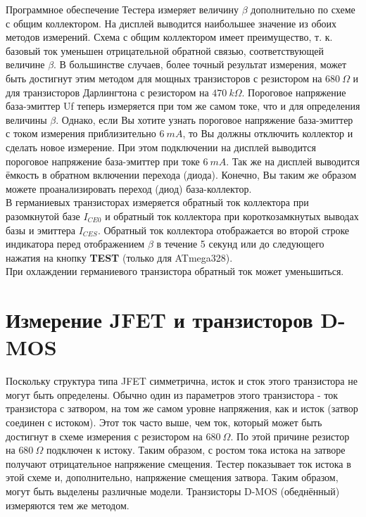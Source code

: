 Программное обеспечение Тестера измеряет величину \(\beta\) дополнительно по схеме с общим коллектором. На дисплей 
выводится наибольшее значение из обоих методов измерений. Схема с общим коллектором имеет преимущество, т. к. базовый 
ток уменьшен отрицательной обратной связью, соответствующей величине \(\beta\). В большинстве случаев, более точный 
результат измерения, может быть достигнут этим методом для мощных транзисторов с резистором на \(680~\Omega\) и для 
транзисторов Дарлингтона с резистором на \(470~k\Omega\).
Пороговое напряжение  база-эмиттер Uf  теперь измеряется при том же самом токе, что и для определения 
величины \(\beta\). Однако, если Вы хотите узнать пороговое напряжение база-эмиттер с током измерения приблизительно 
\(6~mA\), то Вы должны отключить коллектор и сделать новое измерение. При этом подключении на дисплей выводится 
пороговое напряжение база-эмиттер при токе \(6~mA\).  Так же на дисплей выводится ёмкость в обратном включении перехода 
(диода). Конечно, Вы таким же образом можете проанализировать переход (диод) база-коллектор.\\

В германиевых транзисторах измеряется обратный ток коллектора при разомкнутой базе \(I_{CE0}\) и
обратный ток коллектора при короткозамкнутых выводах базы и эмиттера \(I_{CES}\). Обратный ток коллектора 
отображается во второй строке индикатора перед отображением \(\beta\) в течение 5 секунд или до следующего нажатия 
на кнопку \textbf{ TEST} (только для ATmega328).\\

При охлаждении германиевого транзистора обратный ток может уменьшиться.

\section{Измерение JFET и транзисторов D-MOS}
Поскольку структура типа JFET симметрична, исток и сток этого транзистора не могут быть определены. Обычно один из 
параметров этого транзистора - ток транзистора с затвором, на том же самом уровне напряжения, как и исток (затвор 
соединен с истоком). Этот ток часто выше, чем ток, который может быть достигнут в схеме измерения с резистором 
на \(680~\Omega\). По этой причине резистор на \(680~\Omega\) подключен к истоку. Таким образом, с ростом тока  
истока на затворе получают отрицательное напряжение смещения. Тестер показывает ток истока в этой схеме и, 
дополнительно, напряжение смещения затвора. Таким образом, могут быть выделены различные модели. Транзисторы 
D-MOS (обеднённый) измеряются тем же методом.

